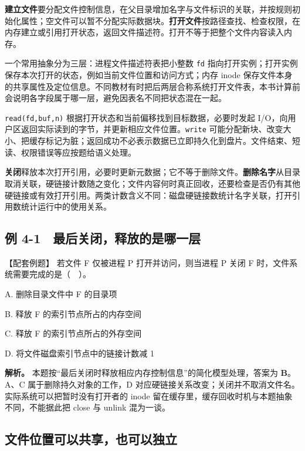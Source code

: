 \textbf{建立文件}要分配文件控制信息，在父目录增加名字与文件标识的关联，并按规则初始化属性；空文件可以暂不分配实际数据块。\textbf{打开文件}按路径查找、检查权限，在内存建立或引用打开状态，返回文件描述符。打开不等于把整个文件内容读入内存。

一个常用抽象分为三层：进程文件描述符表把小整数 \texttt{fd} 指向打开实例；打开实例保存本次打开的状态，例如当前文件位置和访问方式；内存 inode 保存文件本身的共享属性及定位信息。不同教材有时把后两层合称系统打开文件表，本书计算前会说明各字段属于哪一层，避免因表名不同把状态混在一起。

\texttt{read(\allowbreak{}fd,\allowbreak{}buf,\allowbreak{}n)\allowbreak{}} 根据打开状态和当前偏移找到目标数据，必要时发起 I/O，向用户区返回实际读到的字节，并更新相应文件位置。\texttt{write} 可能分配新块、改变大小、把缓存标记为脏；返回成功不必表示数据已立即持久化到盘片。文件结束、短读、权限错误等应按题给语义处理。

\textbf{关闭}释放本次打开引用，必要时更新元数据；它不等于删除文件。\textbf{删除名字}从目录取消关联，硬链接计数随之变化；文件内容何时真正回收，还要检查是否仍有其他硬链接或有效打开引用。两类计数含义不同：磁盘硬链接数统计名字关联，打开引用数统计运行中的使用关系。

\subsection{例 4-1　最后关闭，释放的是哪一层}\label{OS04-ex6-1}

\begin{example}[配套例题]

【配套例题】 若文件 F 仅被进程 P 打开并访问，则当进程 P 关闭 F 时，文件系统需要完成的是（　）。

A. 删除目录文件中 F 的目录项

B. 释放 F 的索引节点所占的内存空间

C. 释放 F 的索引节点所占的外存空间

D. 将文件磁盘索引节点中的链接计数减 1

\end{example}

\textbf{解析。} 本题按``最后关闭时释放相应内存控制信息''的简化模型处理，答案为 \textbf{B}。A、C 属于删除持久对象的工作，D 对应硬链接关系改变；关闭并不取消文件名。实际系统可以把暂时没有打开者的 inode 留在缓存里，缓存回收时机与本题抽象不同，不能据此把 close 与 unlink 混为一谈。

\subsection{文件位置可以共享，也可以独立}\label{OS04-auto-1}

